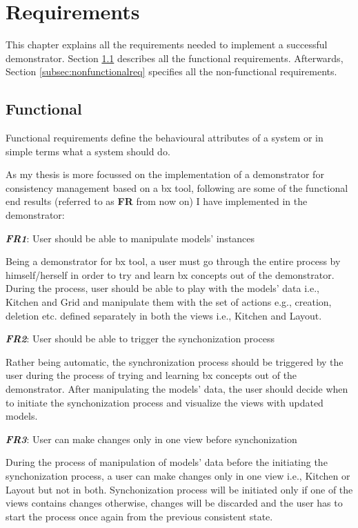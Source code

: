 \section{Requirements}\label{sec:requirements}
This chapter explains all the requirements needed to implement a successful demonstrator. Section \ref{subsec:functionalreq} describes all the functional requirements. Afterwards, Section \ref{subsec:nonfunctionalreq} specifies all the non-functional requirements. 

\subsection{Functional}\label{subsec:functionalreq}
Functional requirements define the behavioural attributes of a system \cite{funcandnonfuncreq} or in simple terms what a system should do.

As my thesis is more focussed on the implementation of a demonstrator for consistency management based on a bx tool, following are some of the functional end results (referred to as \textbf{FR} from now on) I have implemented in the demonstrator:

\textbf{\textit{FR1}}: User should be able to manipulate models' instances

Being a demonstrator for bx tool, a user must go through the entire process by himself/herself in order to try and learn bx concepts out of the demonstrator. During the process, user should be able to play with the models' data i.e., Kitchen and Grid and manipulate them with the set of actions e.g., creation, deletion etc. defined separately in both the views i.e., Kitchen and Layout.

\textbf{\textit{FR2}}: User should be able to trigger the synchonization process

Rather being automatic, the synchronization process should be triggered by the user during the process of trying and learning bx concepts out of the demonstrator. After manipulating the models' data, the user should decide when to initiate the synchonization process and visualize the views with updated models.

\textbf{\textit{FR3}}: User can make changes only in one view before synchonization

During the process of manipulation of models' data before the initiating the synchonization process, a user can make changes only in one view i.e., Kitchen or Layout but not in both. Synchonization process will be initiated only if one of the views contains changes otherwise, changes will be discarded and the user has to start the process once again from the previous consistent state.

